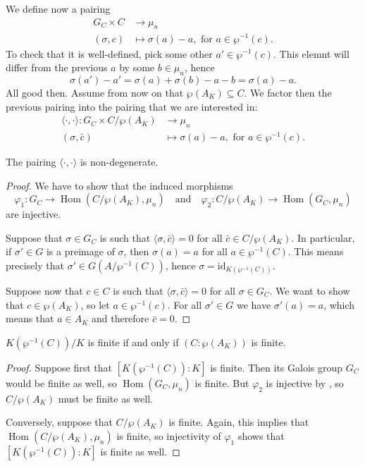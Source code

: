 \documentclass[12pt]{amsart}
\DeclareMathOperator{\Hom}{Hom}
\newcommand{\id}{\mathrm{id}}
\begin{document}
We define now a pairing
\begin{align*}
    G_{C}\times C &\longrightarrow \mu_{n} \\
    (\sigma,c) &\longmapsto \sigma(a)-a, \text{ for }a\in \wp^{-1}(c).
\end{align*}
To check that it is well-defined, pick some other $a'\in \wp^{-1}(c)$.
This elemnt will differ from the previous $a$ by some $b\in \mu_{n}$, hence
\[ \sigma(a')-a'=\sigma(a)+\sigma(b)-a-b=\sigma(a)-a. \]
All good then.
Assume from now on that $\wp(A_{K})\subseteq C$.
We factor then the previous pairing into the pairing that we are interested in:
\begin{align*}
    \langle \cdot,\cdot\rangle \colon G_{C}\times C/\wp(A_{K}) &\longrightarrow \mu_{n} \\
    (\sigma,\bar{c}) & \longmapsto \sigma(a)-a, \text{ for }a\in \wp^{-1}(c).
\end{align*}

\begin{prop}\label{prop:injectivity}
    The pairing $\langle \cdot,\cdot\rangle$ is non-degenerate.
    \begin{proof}
	We have to show that the induced morphisms
	\[ \varphi_{1}\colon G_{C}\to \Hom(C/\wp(A_{K}),\mu_{n}) \quad\text{and}\quad \varphi_{2}\colon C/\wp(A_{K})\to \Hom(G_{C},\mu_{n}) \]
	are injective.

	Suppose that $\sigma\in G_{C}$ is such that $\langle \sigma,\bar{c}\rangle=0$ for all $\bar{c}\in C/\wp(A_{K})$.
	In particular, if $\sigma'\in G$ is a preimage of $\sigma$, then $\sigma(a)=a$ for all $a\in \wp^{-1}(C)$.
	This means precisely that $\sigma'\in G(A/\wp^{-1}(C))$, hence $\sigma=\id_{K(\wp^{-1}(C))}$.

	Suppose now that $c\in C$ is such that $\langle \sigma, \bar{c}\rangle=0$ for all $\sigma\in G_{C}$.
	We want to show that $c\in \wp(A_{K})$, so let $a\in \wp^{-1}(c)$.
	For all $\sigma'\in G$ we have $\sigma'(a)=a$, which means that $a\in A_{K}$ and therefore $\bar{c}=0$.
    \end{proof}
\end{prop}

\begin{prop}\label{prop:finiteness}
    $K(\wp^{-1}(C))/K$ is finite if and only if $(C:\wp(A_{K}))$ is finite.
    \begin{proof}
	Suppose first that $[K(\wp^{-1}(C)):K]$ is finite.
	Then its Galois group $G_{C}$ would be finite as well, so $\Hom(G_{C},\mu_{n})$ is finite.
	But $\varphi_{2}$ is injective by , so $C/\wp(A_{K})$ must be finite as well.

	Conversely, suppose that $C/\wp(A_{K})$ is finite.
	Again, this implies that $\Hom(C/\wp(A_{K}),\mu_{n})$ is finite, so injectivity of $\varphi_{1}$ shows that $[K(\wp^{-1}(C)):K]$ is finite as well.
    \end{proof}
\end{prop}
\end{document}
